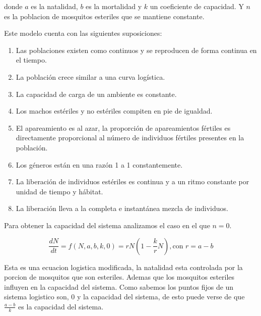\documentclass[twocolumn,aps,prl]{revtex4-1}
\begin{document}
donde $a$ es la natalidad, $b$ es la mortalidad y $k$ un coeficiente de capacidad. Y $n$ es la poblacion de mosquitos esteriles que se mantiene constante.

Este modelo cuenta con las siguientes suposiciones:


\begin{enumerate}[label=\alph*)]
    \item Las poblaciones existen como continuos y se reproducen de forma continua en el tiempo.
    \item La población crece similar a una curva logística.
    \item La capacidad de carga de un ambiente es constante.
    \item Los machos estériles y no estériles compiten en pie de igualdad.
    \item El apareamiento es al azar, la proporción de apareamientos fértiles es directamente proporcional al número de individuos fértiles presentes en la población.
    \item Los géneros están en una razón 1 a 1 constantemente.
    \item La liberación de individuos estériles es continua y a un ritmo constante por unidad de tiempo y hábitat.
    \item La liberación lleva a la completa e instantánea mezcla de individuos.
\end{enumerate}

Para obtener la capacidad del sistema analizamos el caso en el que $n=0$. 

\begin{equation}\label{eq:esteril2}
    \frac{d N}{d t} = f(N,a,b,k,0) 
    = 
    rN(1-\frac{k}{r}N)
    , \text{con } r = a-b
\end{equation}

Esta es una ecuacion logistica modificada, la natalidad esta controlada por la porcion de mosquitos que son esteriles. Ademas que los mosquitos esteriles influyen en la capacidad del sistema. Como sabemos los puntos fijos de un sistema logistico son, 0 y la capacidad del sistema, de esto puede verse de que $\frac{a-b}{k}$ es la capacidad del sistema.
\end{document}
